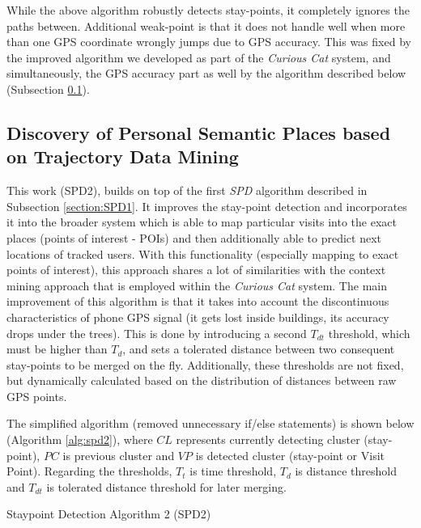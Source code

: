While the above algorithm robustly detects stay-points, it completely ignores
the paths between. Additional weak-point is that it does not handle well when more than one GPS coordinate wrongly jumps due to GPS accuracy. This was fixed by the improved algorithm we developed as part of the \emph{Curious Cat} system, and simultaneously, the GPS accuracy part as well by the algorithm described below (Subsection \ref{section:SPD2}).

\subsection{Discovery of Personal Semantic Places based on Trajectory Data 
Mining}
\label{section:SPD2}
This work \parencite{Lv2016}(SPD2), builds on top of the first \emph{SPD} algorithm 
described in Subsection \ref{section:SPD1}. It improves the stay-point detection and 
incorporates it into the broader system which is able to map particular visits 
into the exact places (points of interest - POIs) and then additionally able to 
predict next locations of tracked users. With this functionality (especially 
mapping to exact points of interest), this approach shares a lot of similarities
with the context mining approach that is employed within the \emph{Curious Cat} 
system. 
The main improvement of this algorithm is that it takes into account the
discontinuous characteristics of phone GPS signal (it gets lost inside buildings, its accuracy drops under the trees). This is done by introducing a second $T_{dt}$ threshold, which must be higher than $T_d$, and sets a tolerated
distance between two consequent stay-points to be merged on the fly. 
Additionally, these thresholds are not fixed, but dynamically calculated based
on the distribution of distances between raw GPS points. 

The simplified algorithm (removed unnecessary if/else statements) is shown 
below (Algorithm \ref{alg:spd2}), where $CL$ represents currently detecting cluster (stay-point), $PC$ is previous cluster and $VP$ is detected cluster (stay-point or Visit Point). Regarding the thresholds, $T_t$ is time threshold, $T_d$ is distance threshold and $T_{dt}$ is tolerated
distance threshold for later merging.

\begin{algorithm}[htb]
\caption{Staypoint Detection Algorithm 2 (SPD2)}
\label{alg:spd2}

\vspace{5pt}
\vspace{5pt}
\end{algorithm}

